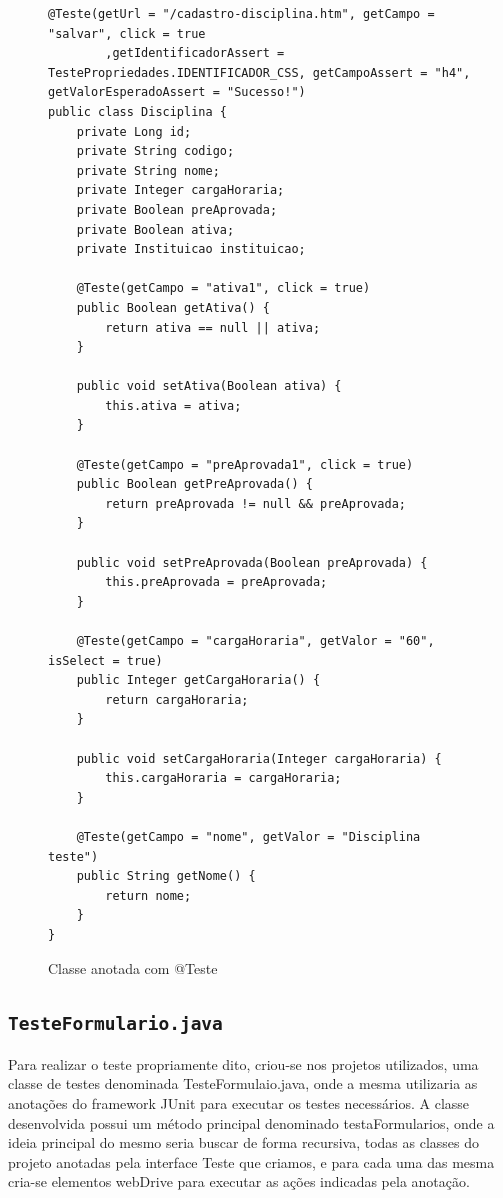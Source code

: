 \documentclass[tg]{mdtufsm}
\begin{document}
\begin{figure}[!htb]
\begin{lstlisting}
@Teste(getUrl = "/cadastro-disciplina.htm", getCampo = "salvar", click = true
        ,getIdentificadorAssert = TestePropriedades.IDENTIFICADOR_CSS, getCampoAssert = "h4", getValorEsperadoAssert = "Sucesso!")
public class Disciplina {
    private Long id;
    private String codigo;
    private String nome;
    private Integer cargaHoraria;
    private Boolean preAprovada;
    private Boolean ativa;
    private Instituicao instituicao;
   
    @Teste(getCampo = "ativa1", click = true)
    public Boolean getAtiva() {
        return ativa == null || ativa;
    }

    public void setAtiva(Boolean ativa) {
        this.ativa = ativa;
    }

    @Teste(getCampo = "preAprovada1", click = true)
    public Boolean getPreAprovada() {
        return preAprovada != null && preAprovada;
    }

    public void setPreAprovada(Boolean preAprovada) {
        this.preAprovada = preAprovada;
    }

    @Teste(getCampo = "cargaHoraria", getValor = "60", isSelect = true)
    public Integer getCargaHoraria() {
        return cargaHoraria;
    }

    public void setCargaHoraria(Integer cargaHoraria) {
        this.cargaHoraria = cargaHoraria;
    }

    @Teste(getCampo = "nome", getValor = "Disciplina teste")
    public String getNome() {
        return nome;
    }
}
\end{lstlisting}
	\caption{Classe anotada com @Teste}
	\label{code:Disciplina.java}
\end{figure}

\subsection{\texttt{TesteFormulario.java}}
Para realizar o teste propriamente dito, criou-se nos projetos utilizados, uma classe de testes denominada TesteFormulaio.java, onde a mesma utilizaria as anotações do framework JUnit  para executar os testes necessários. A classe desenvolvida possui um método principal denominado testaFormularios, onde a ideia principal do mesmo seria buscar de forma recursiva, todas as classes do projeto anotadas pela interface Teste que criamos, e para cada uma das mesma cria-se elementos webDrive para executar as ações indicadas pela anotação. 
\end{document}
